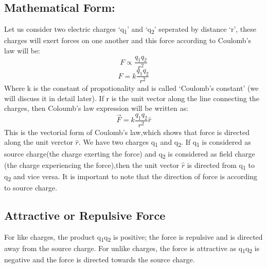 \subsection*{Mathematical Form:}
Let us consider two electric charges `q\textsubscript{1}' and `q\textsubscript{2}' 
seperated by distance `r', these charges will exert forces on one another and this 
force according to Coulomb’s law will be:
\begin{equation}
  F \propto \frac{q_{1}q_{2}}{r^{2}} \nonumber
\end{equation}
\begin{equation} \label{eq:11.1}
  F = k \frac{q_{1}q_{2}}{r^{2}} 
\end{equation}
Where k is the constant of propotionality and 
is called `Coulomb’s constant' (we will discuss it in detail later). If r is the unit vector along the line connecting the charges, then 
Coloumb’s law expression will be written as:
\begin{equation}\label{eq:11.2}
  \vec{F} = k \frac{q_{1}q_{2}}{r^{2}} \hat{r}
\end{equation}
This is the vectorial form of Coulomb's law,which shows that force is directed along the unit verctor $\hat{r}$.
We have two charges q\textsubscript{1} and q\textsubscript{2}. If q\textsubscript{1} is considered as
source charge(the charge exerting the force) and q\textsubscript{2} is considered
as field charge (the charge experiencing the force),then the unit vector $\hat{r}$
is directed from q\textsubscript{1} to q\textsubscript{2} and vice versa.
It is important to note that the direction of force is according to source charge.
\subsection*{Attractive or Repulsive Force}
For like charges, the product q\textsubscript{1}q\textsubscript{2} is positive;
the force is repulsive and is directed away from
the source charge. For unlike charges,
the force is attractive as q\textsubscript{1}q\textsubscript{2} is negative and the force is directed
towards the source charge.
